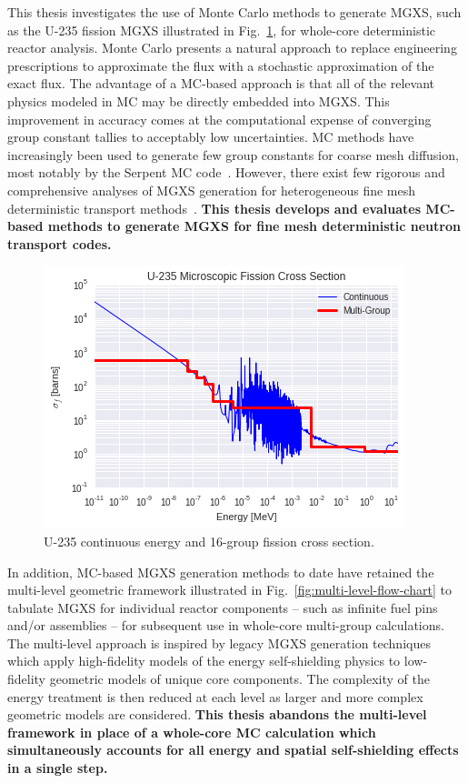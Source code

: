 \documentclass[12pt,twoside]{mitthesis-exec}
\begin{document}

This thesis investigates the use of Monte Carlo methods to generate MGXS, such as the U-235 fission MGXS illustrated in Fig.~\ref{fig:u235-sigf}, for whole-core deterministic reactor analysis. Monte Carlo presents a natural approach to replace engineering prescriptions to approximate the flux with a stochastic approximation of the exact flux. The advantage of a MC-based approach is that all of the relevant physics modeled in MC may be directly embedded into MGXS. This improvement in accuracy comes at the computational expense of converging group constant tallies to acceptably low uncertainties. MC methods have increasingly been used to generate few group constants for coarse mesh diffusion, most notably by the Serpent MC code~\cite{serpent2013manual}. However, there exist few rigorous and comprehensive analyses of MGXS generation for heterogeneous fine mesh deterministic transport methods~\cite{redmond1997multigroup,cai2014condensation,nelson2014improved}. \textbf{This thesis develops and evaluates MC-based methods to generate MGXS for fine mesh deterministic neutron transport codes.}

\begin{figure}[h!]
\centering
\includegraphics[width=0.75\linewidth]{figures/intro/u235-ce-mg-xs}
\caption[U-235 continuous energy and multi-group fission cross section]{U-235 continuous energy and 16-group fission cross section.}
\label{fig:u235-sigf}
\end{figure}

In addition, MC-based MGXS generation methods to date have retained the multi-level geometric framework illustrated in Fig.~\ref{fig:multi-level-flow-chart} to tabulate MGXS for individual reactor components -- such as infinite fuel pins and/or assemblies -- for subsequent use in whole-core multi-group calculations. The multi-level approach is inspired by legacy MGXS generation techniques which apply high-fidelity models of the energy self-shielding physics to low-fidelity geometric models of unique core components. The complexity of the energy treatment is then reduced at each level as larger and more complex geometric models are considered. \textbf{This thesis abandons the multi-level framework in place of a whole-core MC calculation which simultaneously accounts for all energy and spatial self-shielding effects in a single step.}
\end{document}
